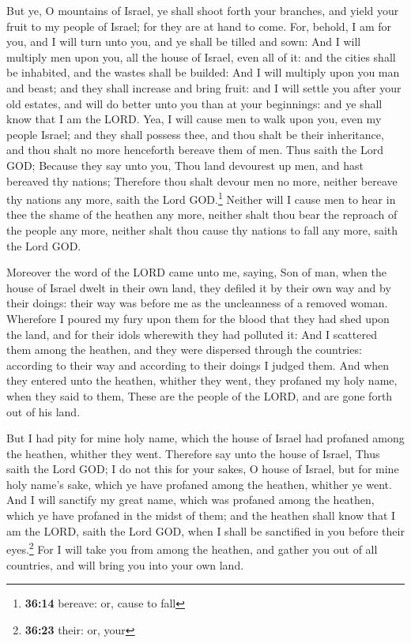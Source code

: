  But ye, O mountains of Israel, ye shall shoot forth your
branches, and yield your fruit to my people of Israel; for they are at
hand to come.  For, behold, I am for you, and I will turn
unto you, and ye shall be tilled and sown:  And I will
multiply men upon you, all the house of Israel, even all of it: and the
cities shall be inhabited, and the wastes shall be builded:
 And I will multiply upon you man and beast; and they
shall increase and bring fruit: and I will settle you after your old
estates, and will do better unto you than at your beginnings: and ye
shall know that I am the LORD.  Yea, I will cause men to
walk upon you, even my people Israel; and they shall possess thee, and
thou shalt be their inheritance, and thou shalt no more henceforth
bereave them of men.  Thus saith the Lord GOD; Because
they say unto you, Thou land devourest up men, and hast bereaved thy
nations;  Therefore thou shalt devour men no more,
neither bereave thy nations any more, saith the Lord GOD.\footnote{\textbf{36:14}
  bereave: or, cause to fall}  Neither will I cause men
to hear in thee the shame of the heathen any more, neither shalt thou
bear the reproach of the people any more, neither shalt thou cause thy
nations to fall any more, saith the Lord GOD.

 Moreover the word of the LORD came unto me, saying,
 Son of man, when the house of Israel dwelt in their own
land, they defiled it by their own way and by their doings: their way
was before me as the uncleanness of a removed woman. 
Wherefore I poured my fury upon them for the blood that they had shed
upon the land, and for their idols wherewith they had polluted it:
 And I scattered them among the heathen, and they were
dispersed through the countries: according to their way and according to
their doings I judged them.  And when they entered unto
the heathen, whither they went, they profaned my holy name, when they
said to them, These are the people of the LORD, and are gone forth out
of his land.

 But I had pity for mine holy name, which the house of
Israel had profaned among the heathen, whither they went.
 Therefore say unto the house of Israel, Thus saith the
Lord GOD; I do not this for your sakes, O house of Israel, but for mine
holy name's sake, which ye have profaned among the heathen, whither ye
went.  And I will sanctify my great name, which was
profaned among the heathen, which ye have profaned in the midst of them;
and the heathen shall know that I am the LORD, saith the Lord GOD, when
I shall be sanctified in you before their eyes.\footnote{\textbf{36:23}
  their: or, your}  For I will take you from among the
heathen, and gather you out of all countries, and will bring you into
your own land.

